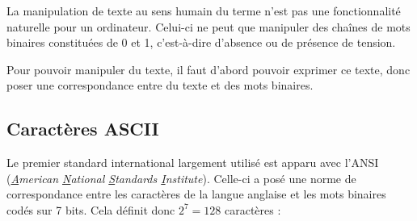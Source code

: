 \documentclass[../../../main.tex]{subfiles}
\begin{document}
La manipulation de texte au sens humain du terme n'est pas une fonctionnalité naturelle pour un ordinateur. Celui-ci ne peut que manipuler des chaînes de mots binaires constituées de 0 et 1, c'est-à-dire d'absence ou de présence de tension.
 
Pour pouvoir manipuler du texte, il faut d'abord pouvoir exprimer ce texte, donc poser une correspondance entre du texte et des mots binaires. 
\subsection{Caractères ASCII}
Le premier standard international largement utilisé est apparu avec l'ANSI (\textit{\underline{A}merican \underline{N}ational \underline{S}tandards \underline{I}nstitute}). Celle-ci a posé une norme de correspondance entre les caractères de la langue anglaise et les mots binaires codés sur 7 bits. Cela définit donc $2^{7} = 128$ caractères :
\end{document}
